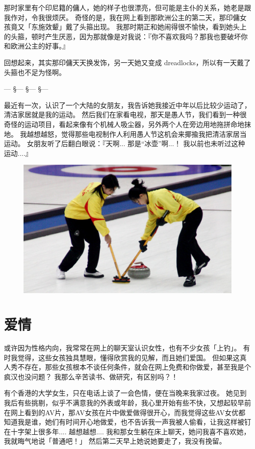 \documentclass[12pt]{report}
\newcommand*\vignette{\begin{center}\color{blue}  --- \quad \S \quad --- \quad \S \quad --- \quad \S \quad --- \end{center}}
\begin{document}
那时家里有个印尼籍的傭人，她的样子也很漂亮，但可能是主仆的关系，她老是跟我作对，令我很烦厌。 奇怪的是，我在网上看到那欧洲公主的第二天，那印傭女孩竟又「东施效颦」戴了头箍出现。 我那时期正和她闹得很不愉快，看到她头上的头箍，顿时产生厌恶，因为那就像是对我说：『你不喜欢我吗？那我也要破坏你和欧洲公主的好事。』

回想起来，其实那印傭天天换发饰，另一天她又变成 dreadlocks，所以有一天戴了头箍也不足为怪啊。

\vignette

最近有一次，认识了一个大陆的女朋友，我告诉她我接近中年以后比较少运动了，清洁家居就是我的运动。 然后我们在家看电视，那天是愚人节，我们看到一种很奇怪的运动项目，看起来像有个机械人吸尘器，另外两个人在旁边用地拖拼命地抹地。 我越想越怒，觉得那些电视制作人利用愚人节这机会来揶揄我把清洁家居当运动。 女朋友听了后翻白眼说：『天啊... 那是``冰壶''啊...！ 我以前也未听过这种运动....』

\begin{figure}
\centering
\includegraphics[scale=0.6]{curling.jpg}
\end{figure}

\chapter{爱情}

或许因为性格内向，我常常在网上的聊天室认识女性，也有不少女孩「上钓」。 有时我觉得，这些女孩独具慧眼，懂得欣赏我的见解，而且她们爱国。 但如果这真人秀不存在，那些女孩根本不谈任何条件，就会在网上免费和你做爱，甚至我是个疯汉也没问题？  我那么辛苦读书、做研究，有区别吗？！

有个香港的大学女生，只在电话上谈了一会色情，便在当晚来我家过夜。 她见到我后有些挑剔，似乎不满意我的外表或年龄，我心里开始有些不快，又想起较早前在网上看到的AV片，那AV女孩在片中做爱做得很开心，而我觉得这些AV女优都知道我是谁，她们有时间开心地做爱，也不告诉我一声我被人偷看，让我这样被钉在十字架上很多年.... 越想越想.... 我和那女生躺在床上聊天，她问我喜不喜欢她，我就晦气地说「普通吧！」 然后第二天早上她说她要走了，我没有挽留。
\end{document}
